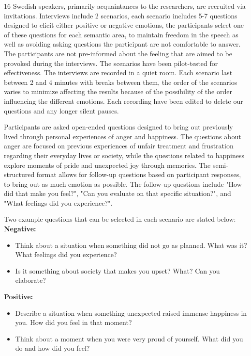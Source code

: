 16 Swedish speakers, primarily acquaintances to the researchers, are recruited via invitations. Interviews include 2 scenarios, 
each scenario includes 5-7 questions designed to elicit either positive or negative emotions, the participants select one of these questions for each semantic area, to maintain freedom in the speech as well as avoiding asking questions the participant are not comfortable to answer. The participants are not pre-informed about the feeling that are aimed to be provoked during the interviews. 
The scenarios have been pilot-tested for effectiveness. 
The interviews are recorded in a quiet room. Each scenario last between 2 and 4 minutes with breaks between them, the order of the scenarios varies to minimize affecting the results because of the possibility of the order influencing the different emotions. Each recording have been edited to delete our questions and any longer silent pauses. 

Participants are asked open-ended questions designed to bring out previously lived through personal experiences of anger and happiness. The questions about anger are focused on previous experiences of unfair treatment and frustration regarding their everyday lives or society, while the questions related to happiness explore moments of pride and unexpected joy through memories. 
The semi-structured format allows for follow-up questions based on participant responses, to bring out as much emotion as possible. The follow-up questions include "How did that make you feel?", "Can you evaluate on that specific situation?", and "What feelings did you experience?". 
 
Two example questions that can be selected in each scenario are stated below: 
\textbf{Negative:}
\begin{itemize}
    \item Think about a situation when something did not go as planned. What was it? What feelings did you experience? 
    \item Is it something about society that makes you upset? What? Can you elaborate? 
\end{itemize}
\textbf{Positive: }
\begin{itemize}
    \item Describe a situation when something unexpected raised immense happiness in you. How did you feel in that moment? 
    \item Think about a moment when you were very proud of yourself. What did you do and how did you feel?
\end{itemize}


